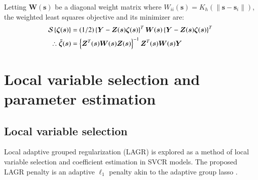 \documentclass[authoryear, review, 11pt]{elsarticle}
\begin{document}
  
    Letting $\bm{W}(\bm{s})$ be a diagonal weight matrix where $W_{ii}(\bm{s}) = K_h( \| \bm{s} - \bm{s}_i \| )$, the weighted least squares objective and its minimizer are:
    \begin{align}\label{eq:zeta-hat}
        \mathcal{S} \left\{ \bm{\zeta} (\bm{s}) \right\} &= (1/2) \left\{ \bm{Y} - \bm{Z}(\bm{s}) \bm{\zeta} (\bm{s}) \right\}^T \bm{W}(\bm{s}) \left\{ \bm{Y} - \bm{Z}(\bm{s}) \bm{\zeta} (\bm{s}) \right\}^T \notag \\
        \therefore \tilde{\bm{\zeta}}(\bm{s}) &= \left\{ \bm{Z}^T(\bm{s}) \bm{W}(\bm{s}) \bm{Z}(\bm{s}) \right\}^{-1} \bm{Z}^T(\bm{s}) \bm{W}(\bm{s}) \bm{Y}
    \end{align}


    
	 

\section{Local variable selection and parameter estimation \label{section:model-selection}}
	\subsection{Local variable selection}
	Local adaptive grouped regularization (LAGR) is explored as a method of local variable selection and coefficient estimation in SVCR models. The proposed LAGR penalty is an adaptive $\ell_1$ penalty akin to the adaptive group lasso \citep{Wang-Leng-2008,Zou:2006}.
\end{document}
